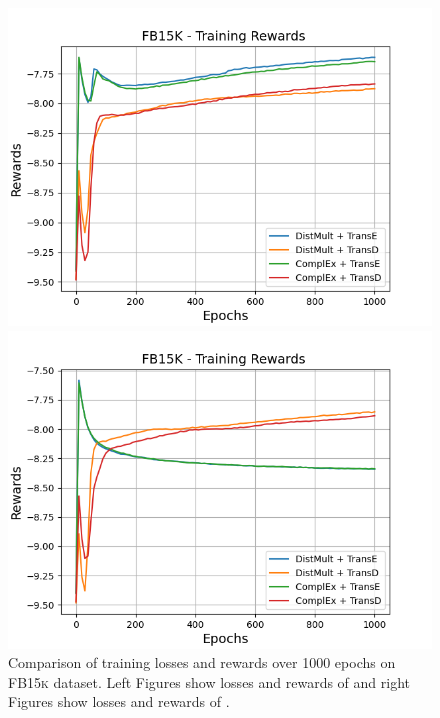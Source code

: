 \begin{figure}[H]
\begin{minipage}{.5\textwidth}
    \end{minipage}
    \begin{minipage}{.5\textwidth}
      \centering
      \includegraphics[width=0.9\linewidth]{figures/results/gan_train/not_pretrained/random/fb15k/1k_epochs/random_fb15k_rew.png}
    \end{minipage}%
    \begin{minipage}{.5\textwidth}
      \centering
      \includegraphics[width=0.9\linewidth]{figures/results/gan_train/not_pretrained/uncertainty/max_distribution/entropy/fb15k/1k_epochs/uncertainty_fb15k_rew.png}
    \end{minipage}%
    \caption{Comparison of training losses and rewards over 1000 epochs on \textsc{FB15k}  dataset.
    Left Figures show losses and rewards of \origsampling and right Figures show losses and rewards of \ussoftmax.}
    \label{fig:advtrain_fb15k_losses_rewards}
\end{figure}